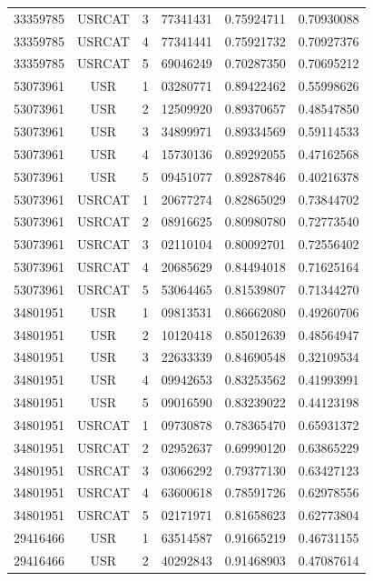 \begin{longtable}{cccccc}
33359785 & USRCAT & 3 & 77341431 & 0.75924711 & 0.70930088\\
33359785 & USRCAT & 4 & 77341441 & 0.75921732 & 0.70927376\\
33359785 & USRCAT & 5 & 69046249 & 0.70287350 & 0.70695212\\
\hline
53073961 & USR    & 1 & 03280771 & 0.89422462 & 0.55998626\\%
53073961 & USR    & 2 & 12509920 & 0.89370657 & 0.48547850\\
53073961 & USR    & 3 & 34899971 & 0.89334569 & 0.59114533\\
53073961 & USR    & 4 & 15730136 & 0.89292055 & 0.47162568\\
53073961 & USR    & 5 & 09451077 & 0.89287846 & 0.40216378\\
53073961 & USRCAT & 1 & 20677274 & 0.82865029 & 0.73844702\\%
53073961 & USRCAT & 2 & 08916625 & 0.80980780 & 0.72773540\\
53073961 & USRCAT & 3 & 02110104 & 0.80092701 & 0.72556402\\
53073961 & USRCAT & 4 & 20685629 & 0.84494018 & 0.71625164\\
53073961 & USRCAT & 5 & 53064465 & 0.81539807 & 0.71344270\\
\hline
34801951 & USR    & 1 & 09813531 & 0.86662080 & 0.49260706\\%
34801951 & USR    & 2 & 10120418 & 0.85012639 & 0.48564947\\
34801951 & USR    & 3 & 22633339 & 0.84690548 & 0.32109534\\
34801951 & USR    & 4 & 09942653 & 0.83253562 & 0.41993991\\
34801951 & USR    & 5 & 09016590 & 0.83239022 & 0.44123198\\
34801951 & USRCAT & 1 & 09730878 & 0.78365470 & 0.65931372\\%
34801951 & USRCAT & 2 & 02952637 & 0.69990120 & 0.63865229\\
34801951 & USRCAT & 3 & 03066292 & 0.79377130 & 0.63427123\\
34801951 & USRCAT & 4 & 63600618 & 0.78591726 & 0.62978556\\
34801951 & USRCAT & 5 & 02171971 & 0.81658623 & 0.62773804\\
\hline
29416466 & USR    & 1 & 63514587 & 0.91665219 & 0.46731155\\%
29416466 & USR    & 2 & 40292843 & 0.91468903 & 0.47087614\\

\end{longtable}
